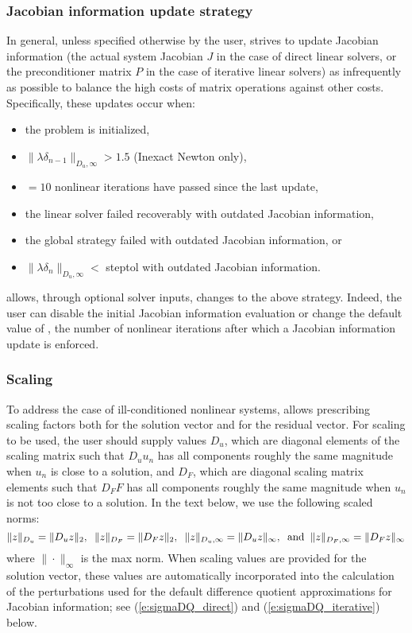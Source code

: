 
\subsubsection*{Jacobian information update strategy}
In general, unless specified otherwise by the user, {\kinsol} strives to update
Jacobian information (the actual system Jacobian $J$ in the case of direct linear
solvers, or the preconditioner matrix $P$ in the case of iterative linear solvers)
as infrequently as possible to balance the high costs of matrix operations against 
other costs. Specifically, these updates occur when:
\begin{itemize}
\item the problem is initialized,
\item $\|\lambda\delta_{n-1}\|_{D_u,\infty} > 1.5$ (Inexact Newton only),
\item {}$=10$ nonlinear iterations have passed since the last update,
\item the linear solver failed recoverably with outdated Jacobian information,
\item the global strategy failed with outdated Jacobian information, or
\item $\|\lambda\delta_{n}\|_{D_u,\infty} < $ {\sc steptol} with outdated Jacobian
  information.
\end{itemize}
{\kinsol} allows, through optional solver inputs, changes to the above strategy.
Indeed, the user can disable the initial Jacobian information evaluation or change
the default value of , the number of nonlinear iterations after which a
Jacobian information update is enforced.


\subsubsection*{Scaling}
To address the case of ill-conditioned nonlinear systems, {\kinsol} allows 
prescribing scaling factors both for the solution vector and for the residual 
vector.
For scaling to be used, the user should supply values $D_u$, which are diagonal 
elements of the scaling matrix such that $D_u u_n$ has all components roughly 
the same magnitude when $u_n$ is close to a solution, and $D_F$, which are diagonal
scaling matrix elements such that $D_F F$ has all components roughly the same 
magnitude when $u_n$ is not too close to a solution. 
In the text below, we use the following scaled norms:
\begin{equation}
\|z\|_{D_u} = \|D_u z\|_2, \;\; \|z\|_{D_F} = \|D_F z\|_2, \;\;
\|z\|_{D_u,\infty} = \|D_u z\|_{\infty}, \;\; {\rm and} \;\;
\|z\|_{D_F,\infty} = \|D_F z\|_{\infty}
\end{equation}
where $\| \cdot \|_{\infty}$ is the max norm.  When scaling values are provided 
for the solution vector, these values are automatically incorporated into the 
calculation of the perturbations used for the default difference quotient 
approximations for Jacobian information; see (\ref{e:sigmaDQ_direct}) and 
(\ref{e:sigmaDQ_iterative}) below.

